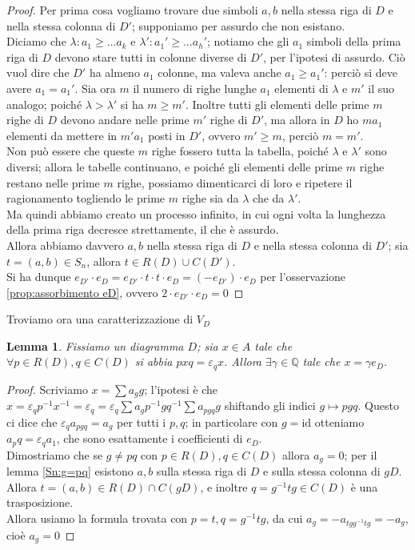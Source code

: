 \documentclass[11pt]{article}
\theoremstyle{plain}
\newtheorem{lemma}[thm]{Lemma}
\theoremstyle{definition}
\theoremstyle{remark}
\newcommand{\Q}{\mathbb{Q}}
\begin{document}
\begin{proof}
	Per prima cosa vogliamo trovare due simboli $a,b$ nella stessa riga di $D$ e nella stessa colonna di $D'$; supponiamo per assurdo che non esistano.\\
	Diciamo che $\lambda: a_1\ge\dots a_k$ e $\lambda':a_1'\ge\dots a_h'$; notiamo che gli $a_1$ simboli della prima riga di $D$ devono stare tutti in colonne diverse di $D'$, per l'ipotesi di assurdo. Ciò vuol dire che $D'$ ha almeno $a_1$ colonne, ma valeva anche $a_1\ge a_1'$: perciò si deve avere $a_1=a_1'$. Sia ora $m$ il numero di righe lunghe $a_1$ elementi di $\lambda$ e $m'$ il suo analogo; poiché $\lambda>\lambda'$ si ha $m\ge m'$. Inoltre tutti gli elementi delle prime $m$ righe di $D$ devono andare nelle prime $m'$ righe di $D'$, ma allora in $D$ ho $ma_1$ elementi da mettere in $m'a_1$ posti in $D'$, ovvero $m'\ge m$, perciò $m=m'$.\\
	Non può essere che queste $m$ righe fossero tutta la tabella, poiché $\lambda$ e $\lambda'$ sono diversi; allora le tabelle continuano, e poiché gli elementi delle prime $m$ righe restano nelle prime $m$ righe, possiamo dimenticarci di loro e ripetere il ragionamento togliendo le prime $m$ righe sia da $\lambda$ che da $\lambda'$.\\
	Ma quindi abbiamo creato un processo infinito, in cui ogni volta la lunghezza della prima riga decresce strettamente, il che è assurdo.\\
	Allora abbiamo davvero $a,b$ nella stessa riga di $D$ e nella stessa colonna di $D'$; sia $t=(a,b)\in S_n$, allora $t\in R(D)\cup C(D')$.\\
	Si ha dunque $e_{D'}\cdot e_{D}=e_{D'}\cdot t\cdot t\cdot e_{D}=(-e_{D'})\cdot e_D$ per l'osservazione \eqref{prop:assorbimento eD}, ovvero $2\cdot e_{D'}\cdot e_{D}=0$
\end{proof}
Troviamo ora una caratterizzazione di $V_D$
\begin{lemma}\label{Sn:caratterizzazione}
	Fissiamo un diagramma $D$; sia $x\in A$ tale che $\forall p\in R(D),q\in C(D)$ si abbia $pxq=\varepsilon_qx$. Allora $\exists\gamma\in\Q$ tale che $x=\gamma e_D$.
\end{lemma}
\begin{proof}
	Scriviamo $x=\sum a_gg$; l'ipotesi è che $x=\varepsilon_q p^{-1}x^{-1}=\varepsilon_q=\varepsilon_q\sum a_g p^{-1}gq^{-1}\sum a_{pgq}g$ shiftando gli indici $g\mapsto pgq$. Questo ci dice che $\varepsilon_q a_{pgq}=a_g$ per tutti i $p,q$; in particolare con $g=\mathrm{id}$ otteniamo $a_pq=\varepsilon_q a_1$, che sono esattamente i coefficienti di $e_D$.\\
	Dimostriamo che se $g\neq pq$ con $p\in R(D),q\in C(D)$ allora $a_g=0$; per il lemma \eqref{Sn:g=pq} esistono $a,b$ sulla stessa riga di $D$ e sulla stessa colonna di $gD$. Allora $t=(a,b)\in R(D)\cap C(gD)$, e inoltre $q=g^{-1}tg\in C(D)$ è una trasposizione.\\
	Allora usiamo la formula trovata con $p=t,q=g^{-1}tg$, da cui $a_g=-a_{tgg^{-1}tg}=-a_g$, cioè $a_g=0$
\end{proof}
\end{document}
